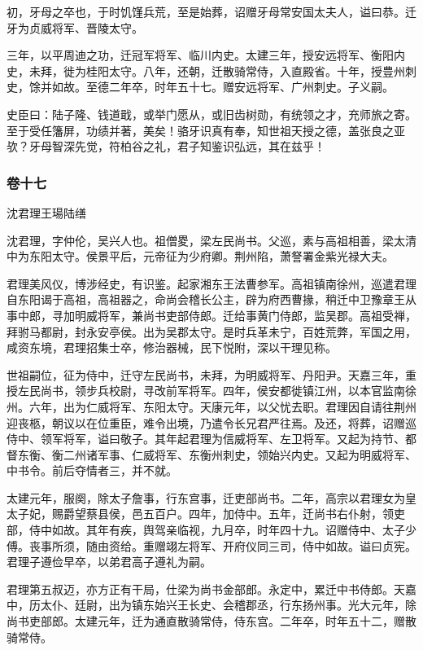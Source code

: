 \documentclass[]{article}
\begin{document}
初，牙母之卒也，于时饥馑兵荒，至是始葬，诏赠牙母常安国太夫人，谥曰恭。迁牙为贞威将军、晋陵太守。

三年，以平周迪之功，迁冠军将军、临川内史。太建三年，授安远将军、衡阳内史，未拜，徙为桂阳太守。八年，还朝，迁散骑常侍，入直殿省。十年，授豊州刺史，馀并如故。至德二年卒，时年五十七。赠安远将军、广州刺史。子义嗣。

史臣曰：陆子隆、钱道戢，或举门愿从，或旧齿树勋，有统领之才，充师旅之寄。至于受任籓屏，功绩并著，美矣！骆牙识真有奉，知世祖天授之德，盖张良之亚欤？牙母智深先觉，符柏谷之礼，君子知鉴识弘远，其在兹乎！

\hypertarget{header-n4703}{%
\subsubsection{卷十七}\label{header-n4703}}

沈君理王瑒陆缮

沈君理，字仲伦，吴兴人也。祖僧畟，梁左民尚书。父巡，素与高祖相善，梁太清中为东阳太守。侯景平后，元帝征为少府卿。荆州陷，萧詧署金紫光禄大夫。

君理美风仪，博涉经史，有识鉴。起家湘东王法曹参军。高祖镇南徐州，巡遣君理自东阳谒于高祖，高祖器之，命尚会稽长公主，辟为府西曹掾，稍迁中卫豫章王从事中郎，寻加明威将军，兼尚书吏部侍郎。迁给事黄门侍郎，监吴郡。高祖受禅，拜驸马都尉，封永安亭侯。出为吴郡太守。是时兵革未宁，百姓荒弊，军国之用，咸资东境，君理招集士卒，修治器械，民下悦附，深以干理见称。

世祖嗣位，征为侍中，迁守左民尚书，未拜，为明威将军、丹阳尹。天嘉三年，重授左民尚书，领步兵校尉，寻改前军将军。四年，侯安都徙镇江州，以本官监南徐州。六年，出为仁威将军、东阳太守。天康元年，以父忧去职。君理因自请往荆州迎丧柩，朝议以在位重臣，难令出境，乃遣令长兄君严往焉。及还，将葬，诏赠巡侍中、领军将军，谥曰敬子。其年起君理为信威将军、左卫将军。又起为持节、都督东衡、衡二州诸军事、仁威将军、东衡州刺史，领始兴内史。又起为明威将军、中书令。前后夺情者三，并不就。

太建元年，服阕，除太子詹事，行东宫事，迁吏部尚书。二年，高宗以君理女为皇太子妃，赐爵望蔡县侯，邑五百户。四年，加侍中。五年，迁尚书右仆射，领吏部，侍中如故。其年有疾，舆驾亲临视，九月卒，时年四十九。诏赠侍中、太子少傅。丧事所须，随由资给。重赠翊左将军、开府仪同三司，侍中如故。谥曰贞宪。君理子遵俭早卒，以弟君高子遵礼为嗣。

君理第五叔迈，亦方正有干局，仕梁为尚书金部郎。永定中，累迁中书侍郎。天嘉中，历太仆、廷尉，出为镇东始兴王长史、会稽郡丞，行东扬州事。光大元年，除尚书吏部郎。太建元年，迁为通直散骑常侍，侍东宫。二年卒，时年五十二，赠散骑常侍。
\end{document}
